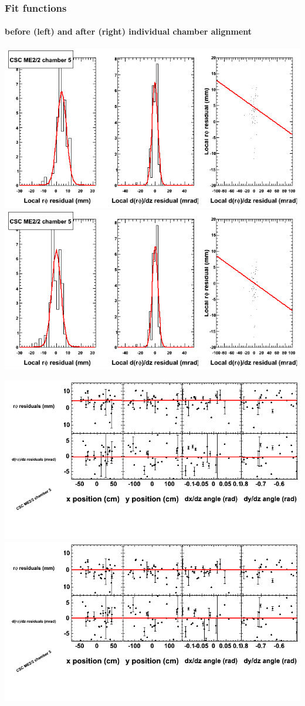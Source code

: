 \documentclass[compress]{beamer}
\begin{document}
\begin{frame}
\frametitle{Fit functions}
\framesubtitle{before (left) and after (right) individual chamber alignment}
\includegraphics[width=0.5\linewidth]{ringfits_3dof/beforefit_MEp22_05_bellcurve.png} \includegraphics[width=0.5\linewidth]{ringfits_3dof/afterfit_MEp22_05_bellcurve.png}

\includegraphics[width=0.5\linewidth]{ringfits_3dof/beforefit_MEp22_05_polynomials.png} \includegraphics[width=0.5\linewidth]{ringfits_3dof/afterfit_MEp22_05_polynomials.png}
\end{frame}
\end{document}
